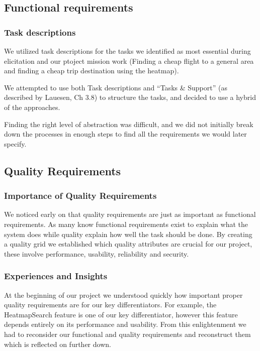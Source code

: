 \subsection{Functional requirements}

\subsubsection{Task descriptions}

We utilized task descriptions for the tasks we identified as most essential
during elicitation and our ptoject mission work (Finding a cheap flight to a general area
and finding a cheap trip destination using the heatmap).

We attempted to use both Task descriptions and ``Tasks \& Support'' (as described by Lauesen, Ch 3.8)
to structure the tasks, and decided to use a hybrid of the approaches.

Finding the right level of abstraction was difficult,
and we did not initially break down the processes in enough steps to find all the requirements we would later specify.

\subsection{Quality Requirements}

\subsubsection{Importance of Quality Requirements}
We noticed early on that quality requirements are just as important as functional requirements. As many know functional requirements exist to explain what the system does while quality explain how well the task should be done. By creating a quality grid we established which quality attributes are crucial for our project, these involve performance, usability, reliability and security. 

\subsubsection{Experiences and Insights}
At the beginning of our project we understood quickly how important proper quality requirements are for our key differentiators. For example, the HeatmapSearch feature is one of our key differentiator, however this feature depends entirely on its performance and usability. From this enlightenment we had to reconsider our functional and quality requirements and reconstruct them which is reflected on further down. 

